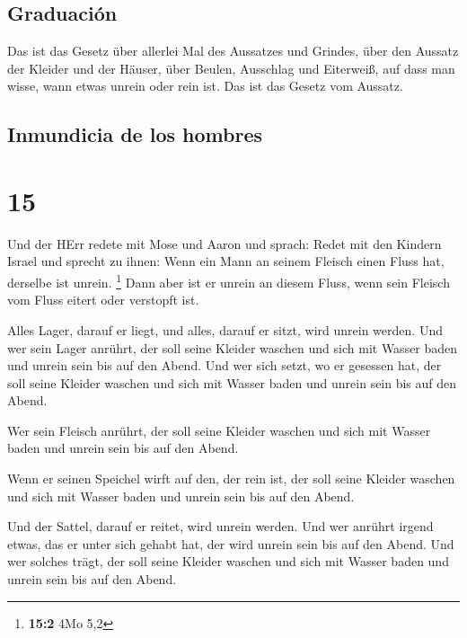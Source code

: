 \hypertarget{graduaciuxf3n}{%
\subsection{Graduación}\label{graduaciuxf3n}}

 Das ist das Gesetz über allerlei Mal des Aussatzes und
Grindes,  über den Aussatz der Kleider und der Häuser,
 über Beulen, Ausschlag und Eiterweiß, 
auf dass man wisse, wann etwas unrein oder rein ist. Das ist das Gesetz
vom Aussatz.

\hypertarget{inmundicia-de-los-hombres}{%
\subsection{Inmundicia de los hombres}\label{inmundicia-de-los-hombres}}

\hypertarget{section-14}{%
\section{15}\label{section-14}}

 Und der HErr redete mit Mose und Aaron und sprach:
 Redet mit den Kindern Israel und sprecht zu ihnen: Wenn
ein Mann an seinem Fleisch einen Fluss hat, derselbe ist unrein.
\footnote{\textbf{15:2} 4Mo 5,2}  Dann aber ist er unrein
an diesem Fluss, wenn sein Fleisch vom Fluss eitert oder verstopft ist.

 Alles Lager, darauf er liegt, und alles, darauf er sitzt,
wird unrein werden.  Und wer sein Lager anrührt, der soll
seine Kleider waschen und sich mit Wasser baden und unrein sein bis auf
den Abend.  Und wer sich setzt, wo er gesessen hat, der
soll seine Kleider waschen und sich mit Wasser baden und unrein sein bis
auf den Abend.

 Wer sein Fleisch anrührt, der soll seine Kleider waschen
und sich mit Wasser baden und unrein sein bis auf den Abend.

 Wenn er seinen Speichel wirft auf den, der rein ist, der
soll seine Kleider waschen und sich mit Wasser baden und unrein sein bis
auf den Abend.

 Und der Sattel, darauf er reitet, wird unrein werden.
 Und wer anrührt irgend etwas, das er unter sich gehabt
hat, der wird unrein sein bis auf den Abend. Und wer solches trägt, der
soll seine Kleider waschen und sich mit Wasser baden und unrein sein bis
auf den Abend.


